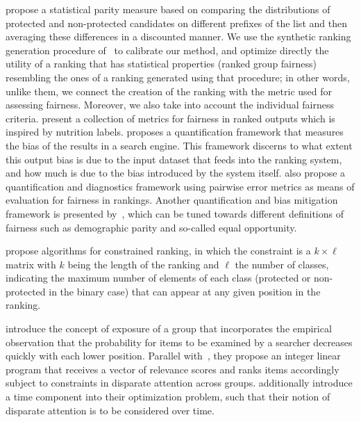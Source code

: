 \citet{yang2016measuring} propose a statistical parity measure based on comparing the distributions of protected and non-protected candidates on different prefixes of the list and then averaging these differences in a discounted manner.
%
%
%
We use the synthetic ranking generation procedure of~\citet{yang2016measuring} to calibrate our method, and optimize directly the utility of a ranking that has statistical properties (ranked group fairness) resembling the ones of a ranking generated using that procedure; in other words, unlike them, we connect the creation of the ranking with the metric used for assessing fairness.
Moreover, we also take into account the individual fairness criteria.
%
\citet{yang2018nutritional} present a collection of metrics for fairness in ranked outputs which is inspired by nutrition labels.
%
\citet{kulshrestha_2017_quantifying} proposes a quantification framework that measures the bias of the results in a search engine.
This framework discerns to what extent this output bias is due to the input dataset that feeds into the ranking system, and how much is due to the bias introduced by the system itself.
%
\citet{kuhlman2019fare} also propose a quantification and diagnostics framework using pairwise error metrics as means of evaluation for fairness in rankings.
%
Another quantification and bias mitigation framework is presented by~\citet{geyik2019fairness}, which can be tuned towards different definitions of fairness such as demographic parity and so-called equal opportunity.

\citet{celis2017ranking} propose algorithms for constrained ranking, in which the constraint is a $k \times \ell$ matrix with $k$ being the length of the ranking and $\ell$ the number of classes, indicating the maximum number of elements of each class (protected or non-protected in the binary case) that can appear at any given position in the ranking.

\citet{singh2018fairness} introduce the concept of exposure of a group that incorporates the empirical observation that the probability for items to be examined by a searcher decreases quickly with each lower position.
%
Parallel with~\citet{biega2018equity}, they propose an integer linear program that receives a vector of relevance scores and ranks items accordingly subject to constraints in disparate attention across groups. \cite{biega2018equity} additionally introduce a time component into their optimization problem, such that their notion of disparate attention is to be considered over time.

